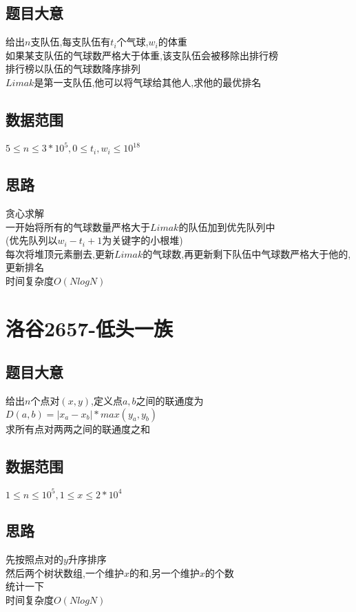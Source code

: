 \documentclass{ctexart}
\numberwithin{equation}{section}
\begin{document}
\begin{flushleft}
  \subsection{题目大意}
  给出$n$支队伍,每支队伍有$t_i$个气球,$w_i$的体重 \\
  如果某支队伍的气球数严格大于体重,该支队伍会被移除出排行榜 \\
  排行榜以队伍的气球数降序排列 \\
  $Limak$是第一支队伍,他可以将气球给其他人,求他的最优排名 \\
  \subsection{数据范围}
  $5\le n\le 3*10^5,0\le t_i,w_i \le 10^{18}$ \\
  \subsection{思路}
  贪心求解 \\
  一开始将所有的气球数量严格大于$Limak$的队伍加到优先队列中\\
  (优先队列以$w_i-t_i+1$为关键字的小根堆) \\
  每次将堆顶元素删去,更新$Limak$的气球数,再更新剩下队伍中气球数严格大于他的,更新排名 \\
  时间复杂度$O(NlogN)$ \\
  \newpage

  \section{洛谷2657-低头一族}
  \subsection{题目大意}
  给出$n$个点对$(x,y)$,定义点$a,b$之间的联通度为$D(a,b)=|x_a-x_b|*max(y_a,y_b)$ \\
  求所有点对两两之间的联通度之和 \\
  \subsection{数据范围}
  $1\le n\le 10^5,1\le x\le 2*10^4$ \\
  \subsection{思路}
  先按照点对的$y$升序排序 \\
  然后两个树状数组,一个维护$x$的和,另一个维护$x$的个数\\
  统计一下 \\
  时间复杂度$O(NlogN)$\\
  \newpage


\end{flushleft}
\end{document}
